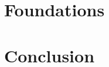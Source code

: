 \documentclass{llncs}
\begin{document}
\section{Foundations}

















\section{Conclusion}
\end{document}
